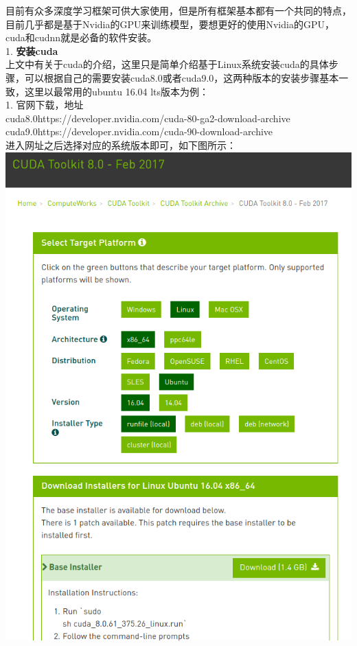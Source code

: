 目前有众多深度学习框架可供大家使用，但是所有框架基本都有一个共同的特点，目前几乎都是基于Nvidia的GPU来训练模型，要想更好的使用Nvidia的GPU，cuda和cudnn就是必备的软件安装。\\
1. \textbf{安装cuda}\\
上文中有关于cuda的介绍，这里只是简单介绍基于Linux系统安装cuda的具体步骤，可以根据自己的需要安装cuda8.0或者cuda9.0，这两种版本的安装步骤基本一致，这里以最常用的ubuntu
16.04 lts版本为例：\\
1. 官网下载，地址\\
cuda8.0https://developer.nvidia.com/cuda-80-ga2-download-archive\\
cuda9.0https://developer.nvidia.com/cuda-90-download-archive\\
进入网址之后选择对应的系统版本即可，如下图所示：\\
\includegraphics{./img/ch15/cuda8.0.png}

